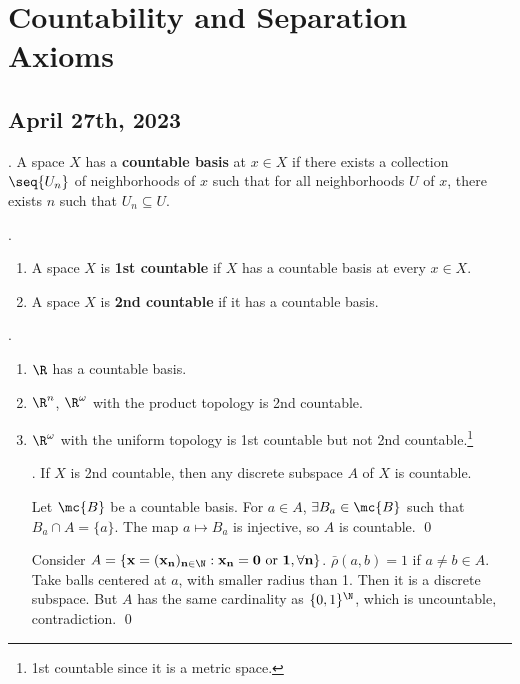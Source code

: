 \chapter{Countability and Separation Axioms}

\section*{April 27th, 2023}


.  A space \(X\) has a \textbf{countable basis} at \(x \in X\) if there exists a collection \(\seq{U_n}\) of neighborhoods of \(x\) such that for all neighborhoods \(U\) of \(x\), there exists \(n\) such that \(U_n \subseteq U\).

.
\begin{enumerate}
    \item {} A space \(X\) is \textbf{1st countable} if \(X\) has a countable basis at every \(x \in X\).
    \item {} A space \(X\) is \textbf{2nd countable} if it has a countable basis.
\end{enumerate}

\ex.
\begin{enumerate}
    \item \(\R\) has a countable basis.
    \item \(\R^n\), \(\R^\omega\) with the product topology is 2nd countable.
    \item \(\R^\omega\) with the uniform topology is 1st countable but not 2nd countable.\footnote{1st countable since it is a metric space.}

          \quad \claim. If \(X\) is 2nd countable, then any discrete subspace \(A\) of \(X\) is countable.

          \quad \pf Let \(\mc{B}\) be a countable basis. For \(a \in A\), \(\exists B_a \in \mc{B}\) such that \(B_a \cap A = \{a\}\). The map \(a \mapsto B_a\) is injective, so \(A\) is countable. \qed

          \pf Consider \(A = \{\bf{x} = (x_n)_{n \in \N} : x_n = 0 \text{ or } 1, \forall n\}\).
          \(\bar{\rho}(a, b) = 1\) if \(a \neq b \in A\). Take balls centered at \(a\), with smaller radius than 1. Then it is a discrete subspace. But \(A\) has the same cardinality as \(\{0, 1\}^{\N}\), which is uncountable, contradiction. \qed
\end{enumerate}

